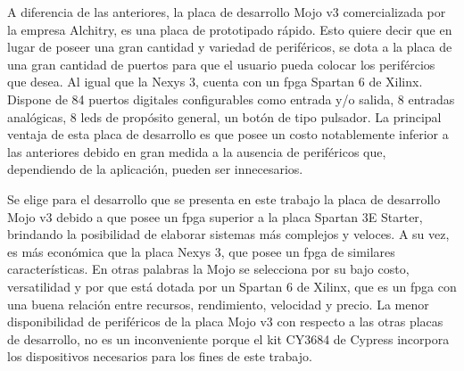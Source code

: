 A diferencia de las anteriores, la placa de desarrollo Mojo v3 comercializada por la empresa Alchitry, es una placa de prototipado rápido. Esto quiere decir que en lugar de poseer una gran cantidad y variedad de periféricos, se dota a la placa de una gran cantidad de puertos para que el usuario pueda colocar los perifércios que desea. Al igual que la Nexys 3, cuenta con un \acrshort{fpga} Spartan 6 de Xilinx. Dispone de 84 puertos digitales configurables como entrada y/o salida, 8 entradas analógicas, 8 \acrshort{led}s de propósito general, un botón de tipo pulsador. La principal ventaja de esta placa de desarrollo es que posee un costo notablemente inferior a las anteriores debido en gran medida a la ausencia de periféricos que, dependiendo de la aplicación, pueden ser innecesarios.

Se elige para el desarrollo que se presenta en este trabajo la placa de desarrollo Mojo v3 debido a que posee un \acrshort{fpga} superior a la placa Spartan 3E Starter, brindando la posibilidad de elaborar sistemas más complejos y veloces. A su vez, es más económica que la placa Nexys 3, que posee un \acrshort{fpga} de similares características. En otras palabras la Mojo se selecciona por su bajo costo, versatilidad y por que está dotada por un Spartan 6 de Xilinx, que es un \acrshort{fpga} con una buena relación entre recursos, rendimiento, velocidad y precio. La menor disponibilidad de periféricos de la placa Mojo v3 con respecto a las otras placas de desarrollo, no es un inconveniente porque el kit CY3684 de Cypress incorpora los dispositivos necesarios para los fines de este trabajo.
%


